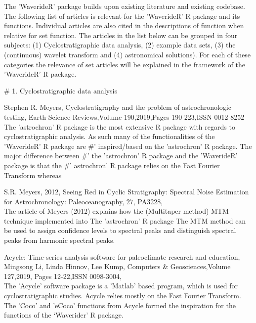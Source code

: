 \documentclass[a4paper]{book}
\begin{document}
\begin{References}
The 'WaverideR' package builds upon existing literature and existing codebase.
The following list of articles is relevant for the 'WaverideR' R package and
its functions. Individual articles are also cited in the descriptions of
function when relative for set function. The articles in the list below can
be grouped in four subjects: (1) Cyclostratigraphic data analysis, (2)
example data sets, (3) the (continuous) wavelet transform and (4)
astronomical solutions). For each of these categories the
relevance of set articles will be explained in the framework of
the 'WaverideR' R package.

\# 1. Cyclostratigraphic data analysis

Stephen R. Meyers, Cyclostratigraphy and the problem of astrochronologic
testing, Earth-Science Reviews,Volume 190,2019,Pages 190-223,ISSN 0012-8252
 \\{}
The 'astrochron' R package is the most extensive R package with regards to
cyclostratigraphic analysis. As such many of the functionalities of the
'WaverideR' R package are \#' inspired/based on the 'astrochron' R package.
The major difference between \#' the 'astrochron' R package and the 'WaverideR'
package is that the \#' astrochron' R package relies on the Fast Fourier Transform whereas

S.R. Meyers, 2012, Seeing Red in Cyclic Stratigraphy: Spectral Noise
Estimation for Astrochronology: Paleoceanography, 27, PA3228,
 \\{}
The article of Meyers (2012) explains how the (Multitaper method) MTM technique
implemented into The 'astrochron' R package The MTM method can be used
to assign confidence levels to spectral peaks and distinguish spectral peaks
from harmonic spectral peaks.

Acycle: Time-series analysis software for paleoclimate research and education,
Mingsong Li, Linda Hinnov, Lee Kump, Computers \& Geosciences,Volume 127,2019,
Pages 12-22,ISSN 0098-3004,  \\{}
The 'Acycle' software package is a 'Matlab' based program, which is used for
cyclostratigraphic studies. Acycle relies mostly on the Fast Fourier Transform.
The 'Coco' and 'eCoco' functions from Acycle formed the inspiration for the
  functions of the
‘Waverider’ R package.


\end{References}
\end{document}
